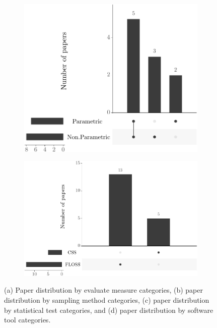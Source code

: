 \begin{figure}[!htp]
\begin{subfigure}{.49\textwidth}
    \includegraphics[width=\textwidth]{figures/distribution-by-statistical-method-category-in-ups.pdf}
    \caption{}
    \label{fig:distribution-by-statistical-method-category}
  \end{subfigure}\hfill
  \begin{subfigure}{.49\textwidth}
    \centering
    \includegraphics[width=\textwidth]{figures/distribution-by-software-tool-category-in-ups.pdf}
    \caption{}
    \label{fig:distribution_by_software_tool_category} 
  \end{subfigure}
  \caption{(a) Paper distribution by evaluate measure categories, (b) paper distribution by sampling method categories, (c) paper distribution by statistical test categories, and (d) paper distribution by software tool categories.}
  \label{fig:rq8_9_10_11_charts}
\end{figure}
